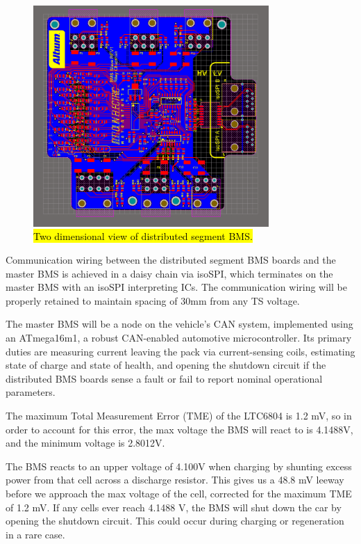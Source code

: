 \documentclass{article}
\begin{document}
\begin{figure}[H]
    \centering
    \includegraphics[width=0.8\textwidth]{BMS_slave_2D}
    \caption{\hl{Two dimensional view of distributed segment BMS.}}
    \label{fig:BMS_slave_2D}
\end{figure}

Communication wiring between the distributed segment BMS boards and the master BMS is achieved in a daisy chain via isoSPI, which terminates on the master BMS with an isoSPI interpreting ICs. The communication wiring will be properly retained to maintain spacing of 30mm from any TS voltage. 

The master BMS will be a node on the vehicle's CAN system, implemented using an ATmega16m1, a robust CAN-enabled automotive microcontroller. Its primary duties are measuring current leaving the pack via current-sensing coils, estimating state of charge and state of health, and opening the shutdown circuit if the distributed BMS boards sense a fault or fail to report nominal operational parameters. 

The maximum Total Measurement Error (TME) of the LTC6804 is 1.2 mV, so in order to account for this error, the max voltage the BMS will react to is 4.1488V, and the minimum voltage is 2.8012V. 

The BMS reacts to an upper voltage of 4.100V when charging by shunting excess power from that cell across a discharge resistor. This gives us a 48.8 mV leeway before we approach the max voltage of the cell, corrected for the maximum TME of 1.2 mV. If any cells ever reach 4.1488 V, the BMS will shut down the car by opening the shutdown circuit. This could occur during charging or regeneration in a rare case. 
\end{document}
